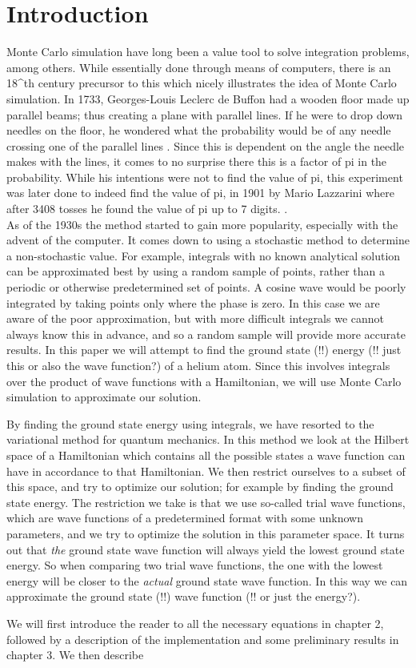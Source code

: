 \section{Introduction}

Monte Carlo simulation have long been a value tool to solve integration problems, among others. While essentially done through means of computers, there is an 18^{th} century precursor to this which nicely illustrates the idea of Monte Carlo simulation. In 1733, Georges-Louis Leclerc de Buffon had a wooden floor made up parallel beams; thus creating a plane with parallel lines. If he were to drop down needles on the floor, he wondered what the probability would be of any needle crossing one of the parallel lines \cite{Buffon}. Since this is dependent on the angle the needle makes with the lines, it comes to no surprise there this is a factor of pi in the probability. While his intentions were not to find the value of pi, this experiment was later done to indeed find the value of pi, in 1901 by Mario Lazzarini where after 3408 tosses he found the value of pi up to 7 digits. \cite{Lazzarini}. \\

As of the 1930s the method started to gain more popularity, especially with the advent of the computer. It comes down to using a stochastic method to determine a non-stochastic value. For example, integrals with no known analytical solution can be approximated best by using a random sample of points, rather than a periodic or otherwise predetermined set of points. A cosine wave would be poorly integrated by taking points only where the phase is zero. In this case we are aware of the poor approximation, but with more difficult integrals we cannot always know this in advance, and so a random sample will provide more accurate results. In this paper we will attempt to find the ground state (!!) energy (!! just this or also the wave function?) of a helium atom. Since this involves integrals over the product of wave functions with a Hamiltonian, we will use Monte Carlo simulation to approximate our solution. 

By finding the ground state energy using integrals, we have resorted to the variational method for quantum mechanics. In this method we look at the Hilbert space of a Hamiltonian which contains all the possible states a wave function can have in accordance to that Hamiltonian. We then restrict ourselves to a subset of this space, and try to optimize our solution; for example by finding the ground state energy. The restriction we take is that we use so-called trial wave functions, which are wave functions of a predetermined format with some unknown parameters, and we try to optimize the solution in this parameter space. It turns out that \textit{the} ground state wave function will always yield the lowest ground state energy. So when comparing two trial wave functions, the one with the lowest energy will be closer to the \textit{actual} ground state wave function. In this way we can approximate the ground state (!!) wave function (!! or just the energy?). \cite{AdvStatMech}

We will first introduce the reader to all the necessary equations in chapter 2, followed by a description of the implementation and some preliminary results in chapter 3. We then describe 